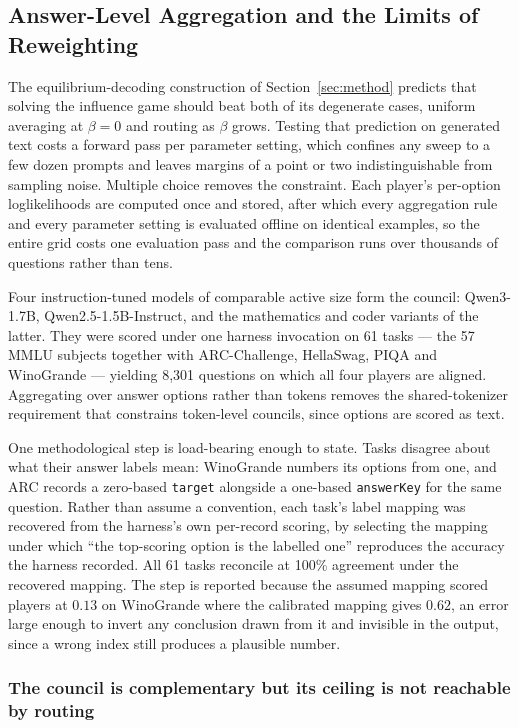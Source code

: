 \subsection{Answer-Level Aggregation and the Limits of Reweighting}
\label{sec:results:aggregation}

The equilibrium-decoding construction of Section~\ref{sec:method} predicts
that solving the influence game should beat both of its degenerate cases,
uniform averaging at $\beta = 0$ and routing as $\beta$ grows. Testing that
prediction on generated text costs a forward pass per parameter setting, which
confines any sweep to a few dozen prompts and leaves margins of a point or two
indistinguishable from sampling noise. Multiple choice removes the constraint.
Each player's per-option loglikelihoods are computed once and stored, after
which every aggregation rule and every parameter setting is evaluated offline on
identical examples, so the entire grid costs one evaluation pass and the
comparison runs over thousands of questions rather than tens.

Four instruction-tuned models of comparable active size form the council:
Qwen3-1.7B, Qwen2.5-1.5B-Instruct, and the mathematics and coder variants of the
latter. They were scored under one harness invocation on 61 tasks --- the 57 MMLU
subjects together with ARC-Challenge, HellaSwag, PIQA and WinoGrande --- yielding
8{,}301 questions on which all four players are aligned. Aggregating over answer
options rather than tokens removes the shared-tokenizer requirement that
constrains token-level councils, since options are scored as text.

One methodological step is load-bearing enough to state. Tasks disagree about
what their answer labels mean: WinoGrande numbers its options from one, and ARC
records a zero-based \texttt{target} alongside a one-based \texttt{answerKey} for
the same question. Rather than assume a convention, each task's label mapping was
recovered from the harness's own per-record scoring, by selecting the mapping
under which ``the top-scoring option is the labelled one'' reproduces the
accuracy the harness recorded. All 61 tasks reconcile at 100\% agreement under
the recovered mapping. The step is reported because the assumed mapping scored
players at $0.13$ on WinoGrande where the calibrated mapping gives $0.62$, an
error large enough to invert any conclusion drawn from it and invisible in the
output, since a wrong index still produces a plausible number.

\subsubsection{The council is complementary but its ceiling is not reachable by routing}

